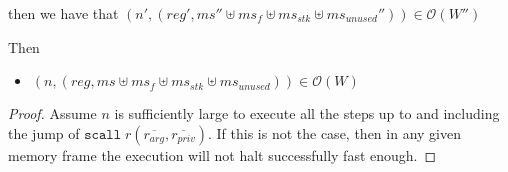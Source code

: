 \documentclass[a4paper]{article}
\newcommand{\var}[1]{\mathit{#1}}
\newcommand{\hs}{\var{ms}}
\newcommand{\ms}{\hs}
\newcommand{\reg}{\var{reg}}
\newcommand{\stk}{\var{stk}}
\newcommand{\observations}{\mathcal{O}}
\newcommand{\npair}[2][n]{\left(#1,#2 \right)}
\begin{document}
\begin{lemma}
\begin{itemize}
    then we have that $\npair[n']{(\reg',\ms'' \uplus \ms_f \uplus \ms_\stk \uplus \ms_{\var{unused}}'')} \in \observations(W'')$
  \end{itemize}
  Then 
  \begin{itemize}
    \item $\npair{(\reg,\ms \uplus \ms_f \uplus \ms_\stk \uplus \ms_{\var{unused}})} \in \observations(W)$
  \end{itemize}

\end{lemma}
\begin{proof}
  Assume $n$ is sufficiently large to execute all the steps up to and including the jump of $\mathtt{scall}\; r(\overline{r_{\var{arg}}},\overline{r_{\var{priv}}})$. If this is not the case, then in any given memory frame the execution will not halt successfully fast enough.


\end{proof}
\end{document}
